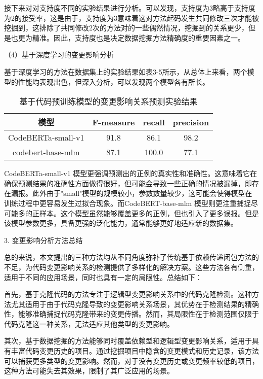接下来对对支持度不同的实验结果进行分析。可以发现，支持度为3略高于支持度为2的接受率，这是由于，支持度为3意味着这对方法起码发生共同修改三次才能被挖掘到，这排除了共同修改2次的方法对的一些偶然情况，挖掘到的关系更少，但是也更为精准。因此，支持度也是决定数据挖掘方法精确度的重要因素之一。


（4）基于深度学习的变更影响分析

基于深度学习的方法在数据集上的实验结果如表3-5所示，从总体上来看，两个模型的性能均表现出色，但深入分析，可以发现两个模型各有所长。

\begin{table}[htbp]
\caption{基于代码预训练模型的变更影响关系预测实验结果}
\vspace{0.5em}\centering\wuhao
\begin{tabular}{cccc}
\toprule
模型& F-measure & recall & precision \\
\midrule
CodeBERTa-small-v1 & 91.8 & 86.1 & 98.2 \\
codebert-base-mlm  & 87.1 & 100.0  & 77.1 \\
\bottomrule
\end{tabular}
\end{table}

CodeBERTa-small-v1 模型更强调预测出的正例的真实性和准确性。这意味着它在确保预测结果的准确性方面做得很好，但可能会导致一些正确的情况被漏掉，即存在漏报。此外由于"small"模型的规模较小，参数数量较少，这可能会使得模型在训练过程中更容易发生过拟合现象。而CodeBERT-base-mlm 模型则更注重捕捉尽可能多的正样本。这个模型虽然能够覆盖更多的正例，但也引入了更多误报。但是该模型参数更多，具备更强的泛化能力，通常能够更好地适应新的数据集。

3. 变更影响分析方法总结

总的来说，本文提出的三种方法均从不同角度弥补了传统基于依赖传递闭包方法的不足，为代码变更影响关系的检测提供了多样化的解决方案。这些方法各有侧重，适用于不同的应用场景，同时也具有一定的局限性。总结如下：

首先，基于克隆代码的方法专注于逻辑型变更影响关系中的代码克隆检测。这种方法尤其适用于由于代码克隆导致的变更影响关系场景，其优势在于检测结果的精确性，能够准确捕捉代码克隆带来的变更传播。然而，其局限性在于检测范围仅限于代码克隆这一种关系，无法适应其他类型的变更影响。

其次，基于数据挖掘的方法能够同时覆盖依赖型和逻辑型变更影响关系，适用于具有丰富代码变更历史的项目。通过挖掘项目中隐含的变更模式和历史记录，该方法可以捕获更多类型的变更影响。然而，对于没有变更历史或变更频率较低的项目，这种方法可能失去其效果，限制了其广泛应用的场景。

